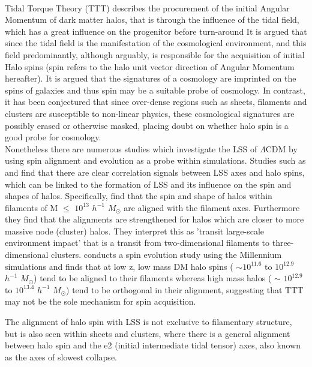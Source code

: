 \documentclass[a4paper,fleqn,usenatbib]{mnras}
\def \lcdm{$\Lambda$CDM }
\begin{document}
\\
Tidal Torque Theory (TTT) describes the procurement of the initial Angular Momentum of dark matter halos, that is through the influence of the tidal field, which has a great influence on the progenitor before turn-around \citep[Holye 1949][]{Peebles_69,Zeldovich_70} 
It is argued that since the tidal field is the manifestation of the cosmological environment, and this field predominantly, although arguably, is responsible for the acquisition of initial Halo spins (spin refers to the halo unit vector direction of Angular Momentum hereafter). It is argued that the signatures of a cosmology are imprinted on the spins of galaxies \citep{Lee_pen_00} and thus spin may be a suitable probe of cosmology. In contrast, it has been conjectured that since over-dense regions such as sheets, filaments and clusters are susceptible to non-linear physics, these cosmological signatures are possibly erased or otherwise masked, placing doubt on whether halo spin is a good probe for cosmology.
\\
Nonetheless there are numerous studies which investigate the  LSS of \lcdm by using spin alignment and evolution as a probe within simulations. Studies such as \citet{Faltenbacher_02,Calvo_07,Zhang_09} and \citet{Hahn_07} find that there are clear correlation signals between LSS axes and halo spins, which can be linked to the formation of LSS and its influence on the spin and shapes of halos. Specifically, \citet{Zhang_09} find that the spin and shape of halos within filaments of M $\leq$ $10^{13}$ $h^{-1}$ \(M_\odot\) are aligned with the filament axes. Furthermore they find that the alignments are strengthened for halos which are closer to more massive node (cluster) halos. They interpret this as 'transit large-scale environment impact' that is a transit from two-dimensional filaments to three-dimensional clusters.
\citet{Trowland_13} conducts a spin evolution study using the Millennium simulations and finds that at low z, low mass DM halo spins ( $\sim$$10^{11.6}$ to $10^{12.9}$ $h^{-1}$ \(M_\odot\)) tend to be aligned to their filaments whereas high mass halos ( $\sim$ $10^{12.9}$ to $10^{13.4}$ $h^{-1}$ \(M_\odot\)) tend to be orthogonal in their alignment, suggesting that TTT may not be the sole mechanism for spin acquisition.  

The alignment of halo spin with LSS is not exclusive to filamentary structure, but is also seen within sheets and clusters, where there is a general alignment between halo spin and the e2 (initial intermediate tidal tensor) axes, also known as the axes of slowest collapse. \citep{Libeskind_12,Dubois_14,Calvo_14,Kang_15,Wang_17,Veena_18} 
\end{document}
